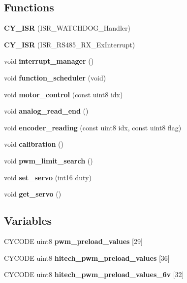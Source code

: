 \subsection*{Functions}
\begin{DoxyCompactItemize}
\item 
\mbox{\label{interruptions_8c_aba74df0c62c62434ebccf8124c5d5fef}} 
{\bfseries C\+Y\+\_\+\+I\+SR} (I\+S\+R\+\_\+\+W\+A\+T\+C\+H\+D\+O\+G\+\_\+\+Handler)
\item 
\mbox{\label{interruptions_8c_a7692d8c3185943c5bdfaa6de0a172ad3}} 
{\bfseries C\+Y\+\_\+\+I\+SR} (I\+S\+R\+\_\+\+R\+S485\+\_\+\+R\+X\+\_\+\+Ex\+Interrupt)
\item 
\mbox{\label{interruptions_8c_a9790811526002d99b25a814afd02cbae}} 
void {\bfseries interrupt\+\_\+manager} ()
\item 
\mbox{\label{interruptions_8c_a39df971c4e9f194be50c54dfd7aeabfe}} 
void {\bfseries function\+\_\+scheduler} (void)
\item 
\mbox{\label{interruptions_8c_a717216ab689fc8b8ea3fb8795a816a2b}} 
void {\bfseries motor\+\_\+control} (const uint8 idx)
\item 
\mbox{\label{interruptions_8c_a00a8d34962a63161405e5d7785b9625e}} 
void {\bfseries analog\+\_\+read\+\_\+end} ()
\item 
\mbox{\label{interruptions_8c_ac8679c9d627ace495295abdacbc7dcf2}} 
void {\bfseries encoder\+\_\+reading} (const uint8 idx, const uint8 flag)
\item 
\mbox{\label{interruptions_8c_a6d9dc88d64cd1f74a30fd0e404a3bb31}} 
void {\bfseries calibration} ()
\item 
\mbox{\label{interruptions_8c_ab7b287cf5df2ea548297b951be2f20d4}} 
void {\bfseries pwm\+\_\+limit\+\_\+search} ()
\item 
\mbox{\label{interruptions_8c_a454a1d47ea0044672f38fe2199518846}} 
void {\bfseries set\+\_\+servo} (int16 duty)
\item 
\mbox{\label{interruptions_8c_a820fef0be6eb876b1ab318e1dedd568c}} 
void {\bfseries get\+\_\+servo} ()
\end{DoxyCompactItemize}
\subsection*{Variables}
\begin{DoxyCompactItemize}
\item 
C\+Y\+C\+O\+DE uint8 {\bfseries pwm\+\_\+preload\+\_\+values} [29]
\item 
\mbox{\label{interruptions_8c_a4234b71c84e0fb74d3ad698276b90f6e}} 
C\+Y\+C\+O\+DE uint8 {\bfseries hitech\+\_\+pwm\+\_\+preload\+\_\+values} [36]
\item 
\mbox{\label{interruptions_8c_a6dc1a7b985a28e3db77fad72bfbc0b46}} 
C\+Y\+C\+O\+DE uint8 {\bfseries hitech\+\_\+pwm\+\_\+preload\+\_\+values\+\_\+6v} [32]
\end{DoxyCompactItemize}


